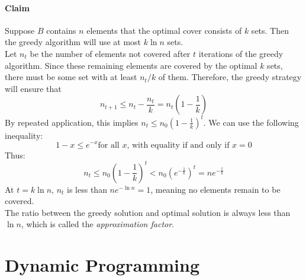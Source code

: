 \paragraph{Claim}
Suppose $B$ contains $n$ elements that the optimal cover consists of $k$ sets.
Then the greedy algorithm will use at most $k \ln n$ sets.\\
Let $n_t$ be the number of elements not covered after $t$ iterations of the greedy algorithm.
Since these remaining elements are covered by the optimal $k$ sets, there must be some set with at least $n_t / k$ of them.
Therefore, the greedy strategy will ensure that $$n_{t+1} \leq n_t - \frac{n_t}{k} = n_t(1 - \frac{1}{k})$$
By repeated application, this implies $n_t \leq n_0 (1 - \frac{1}{k})^t$.
We can use the following inequality: $$1 - x \leq e^{-x} \text{for all $x$, with equality if and only if $x = 0$}$$
Thus: $$n_t \leq n_0(1 - \frac{1}{k})^t < n_0(e^{-\frac{1}{k}})^t = ne^{-\frac{t}{k}}$$
At $t = k \ln n$, $n_t$ is less than $ne^{-\ln n} = 1$, meaning no elements remain to be covered.\\
The ratio between the greedy solution and optimal solution is always less than $\ln n$, which is called the \textit{approximation factor}.

\pagebreak
\section{Dynamic Programming}


